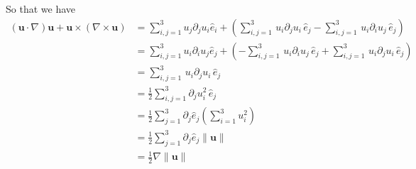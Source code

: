 So that we have 
\begin{equation}
\begin{aligned}
\left(\textbf{u}\cdot \nabla\right)\textbf{u} + \textbf{u}\times\left(\nabla\times\textbf{u}\right)
&= \sum_{i,j=1}^{3}u_j\partial_ju_i\hat{e}_i
+ \left(\sum_{i,j=1}^{3}\,u_i\partial_{j}u_i \,\hat{e}_j
- \sum_{i,j=1}^{3}\,u_i\partial_{i}u_j \,\hat{e}_j\right)\\
&= \sum_{i,j=1}^{3}u_i\partial_iu_j\hat{e}_j
+ \left( - \sum_{i,j=1}^{3}\,u_i\partial_{i}u_j \,\hat{e}_j+\sum_{i,j=1}^{3}\,u_i\partial_{j}u_i \,\hat{e}_j\right)\\
&= \sum_{i,j=1}^{3}\,u_i\partial_{j}u_i \,\hat{e}_j\\
&= \frac{1}{2}\sum_{i,j=1}^{3}\partial_{j}u_i^2 \,\hat{e}_j\\
&= \frac{1}{2}\sum_{j=1}^{3}\partial_{j}\hat{e}_j\left(\sum_{i=1}^{3}u_i^2\right)\\
&= \frac{1}{2}\sum_{j=1}^{3}\partial_{j}\hat{e}_j\lVert\textbf{u}\rVert\\
&= \frac{1}{2}\nabla\lVert\textbf{u}\rVert\\
\end{aligned}
\end{equation}


